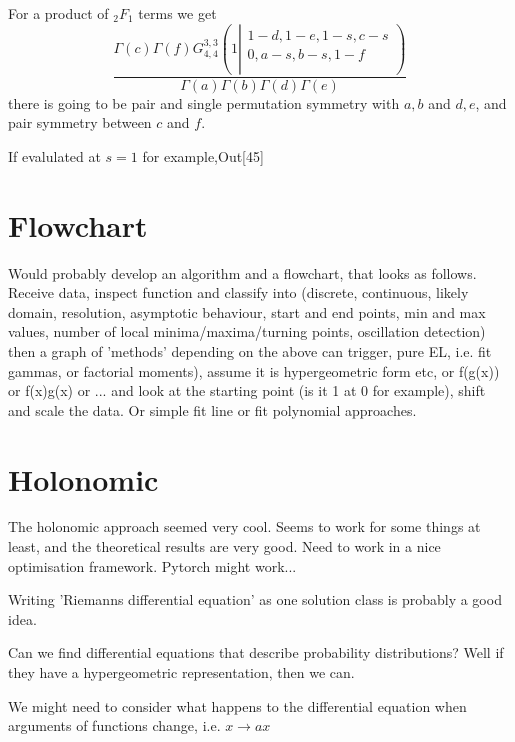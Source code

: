 \documentclass{article}
\begin{document}
For a product of $_2F_1$ terms we get 
$$
\frac{\Gamma (c) \Gamma (f) G_{4,4}^{3,3}\left(1\left|
                  \begin{array}{c}
                   1-d,1-e,1-s,c-s \\
                   0,a-s,b-s,1-f \\
                  \end{array}
                  \right.\right)}{\Gamma (a) \Gamma (b) \Gamma (d) \Gamma (e)}
$$
there is going to be pair and single permutation symmetry with $a,b$ and $d,e$, and pair symmetry between $c$ and $f$.

If evalulated at $s=1$ for example,Out[45]


\section{Flowchart}
Would probably develop an algorithm and a flowchart, that looks as follows. 
Receive data, inspect function and classify into 
(discrete, continuous, likely domain, resolution, asymptotic behaviour, start and end points, min and max values, number of local minima/maxima/turning points, oscillation detection)
then a graph of 'methods' depending on the above can trigger, pure EL, i.e. fit gammas, or factorial moments), assume it is hypergeometric form etc, or f(g(x)) or f(x)g(x) or ... and look at the starting point (is it 1 at 0 for example), shift and scale the data. Or simple fit line or fit polynomial approaches.

\section{Holonomic}
The holonomic approach seemed very cool. Seems to work for some things at least, and the theoretical results are very good. Need to work in a nice optimisation framework. Pytorch might work... 

Writing 'Riemanns differential equation' as one solution class is probably a good idea. 

Can we find differential equations that describe probability distributions? Well if they have a hypergeometric representation, then we can.

We might need to consider what happens to the differential equation when arguments of functions change, i.e. $x \to ax$


            
                  
                  
                  
\end{document}
